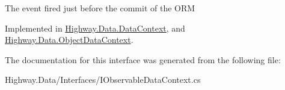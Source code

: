 The event fired just before the commit of the O\-R\-M 



Implemented in \hyperlink{class_highway_1_1_data_1_1_data_context_a92833ad619f66fb7245638ff88dedf94}{Highway.\-Data.\-Data\-Context}, and \hyperlink{class_highway_1_1_data_1_1_object_data_context_a58b23aa4f60cbcee50ccf12ebcf20d82}{Highway.\-Data.\-Object\-Data\-Context}.



The documentation for this interface was generated from the following file\-:\begin{DoxyCompactItemize}
\item 
Highway.\-Data/\-Interfaces/I\-Observable\-Data\-Context.\-cs\end{DoxyCompactItemize}
